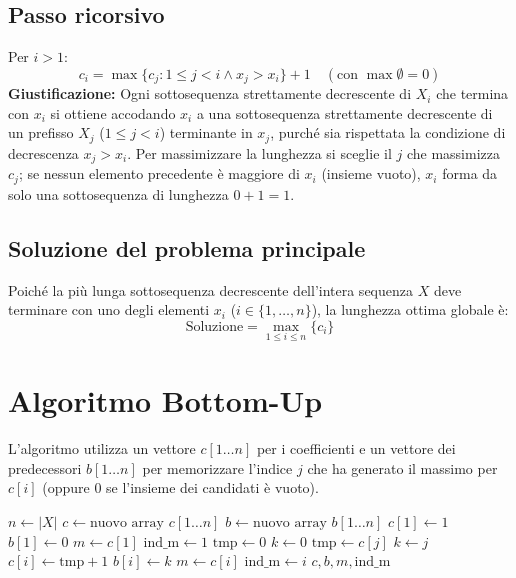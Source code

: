 \subsection{Passo ricorsivo}
Per $i > 1$:
\[
    c_i = \max \{ c_j : 1 \le j < i \land x_j > x_i \} + 1 \quad (\text{con } \max \emptyset = 0)
\]
\textbf{Giustificazione:} Ogni sottosequenza strettamente decrescente di $X_i$ che termina con $x_i$ si ottiene accodando $x_i$ a una sottosequenza strettamente decrescente di un prefisso $X_j$ ($1 \le j < i$) terminante in $x_j$, purché sia rispettata la condizione di decrescenza $x_j > x_i$. Per massimizzare la lunghezza si sceglie il $j$ che massimizza $c_j$; se nessun elemento precedente è maggiore di $x_i$ (insieme vuoto), $x_i$ forma da solo una sottosequenza di lunghezza $0 + 1 = 1$.

\subsection{Soluzione del problema principale}
Poiché la più lunga sottosequenza decrescente dell'intera sequenza $X$ deve terminare con uno degli elementi $x_i$ ($i \in \{1, \dots, n\}$), la lunghezza ottima globale è:
\[
    \text{Soluzione} = \max_{1 \le i \le n} \{ c_i \}
\]

\section{Algoritmo Bottom-Up}
L'algoritmo utilizza un vettore $c[1 \dots n]$ per i coefficienti e un vettore dei predecessori $b[1 \dots n]$ per memorizzare l'indice $j$ che ha generato il massimo per $c[i]$ (oppure $0$ se l'insieme dei candidati è vuoto).

\begin{algorithm}[htbp]
\caption{Calcolo Bottom-Up per LDS}
\begin{algorithmic}[1]
    \State $n \gets |X|$
    \State $c \gets \text{nuovo array } c[1 \dots n]$
    \State $b \gets \text{nuovo array } b[1 \dots n]$
    \State $c[1] \gets 1$
    \State $b[1] \gets 0$
    \State $m \gets c[1]$
    \State $\text{ind\_m} \gets 1$
        \State $\text{tmp} \gets 0$
        \State $k \gets 0$
                \State $\text{tmp} \gets c[j]$
                \State $k \gets j$
            \EndIf
        \EndFor
        \State $c[i] \gets \text{tmp} + 1$
        \State $b[i] \gets k$
            \State $m \gets c[i]$
            \State $\text{ind\_m} \gets i$
        \EndIf
    \EndFor
    \State \Return $c, b, m, \text{ind\_m}$
\EndProcedure
\end{algorithmic}
\end{algorithm}

